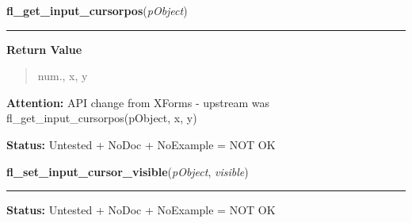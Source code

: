     \label{xformslib:library:fl_get_input_cursorpos}

    \vspace{0.5ex}

\hspace{.8\funcindent}\begin{boxedminipage}{\funcwidth}

    \raggedright \textbf{fl\_get\_input\_cursorpos}(\textit{pObject})

    \vspace{-1.5ex}

    \rule{\textwidth}{0.5\fboxrule}
\setlength{\parskip}{2ex}
\setlength{\parskip}{1ex}
      \textbf{Return Value}
    \vspace{-1ex}

      \begin{quote}
      num., x, y

      \end{quote}

\textbf{Attention:} API change from XForms - upstream was fl\_get\_input\_cursorpos(pObject, x,
y)



\textbf{Status:} Untested + NoDoc + NoExample = NOT OK



    \end{boxedminipage}

    \label{xformslib:library:fl_set_input_cursor_visible}

    \vspace{0.5ex}

\hspace{.8\funcindent}\begin{boxedminipage}{\funcwidth}

    \raggedright \textbf{fl\_set\_input\_cursor\_visible}(\textit{pObject}, \textit{visible})

    \vspace{-1.5ex}

    \rule{\textwidth}{0.5\fboxrule}
\setlength{\parskip}{2ex}
\setlength{\parskip}{1ex}
\textbf{Status:} Untested + NoDoc + NoExample = NOT OK



    \end{boxedminipage}

